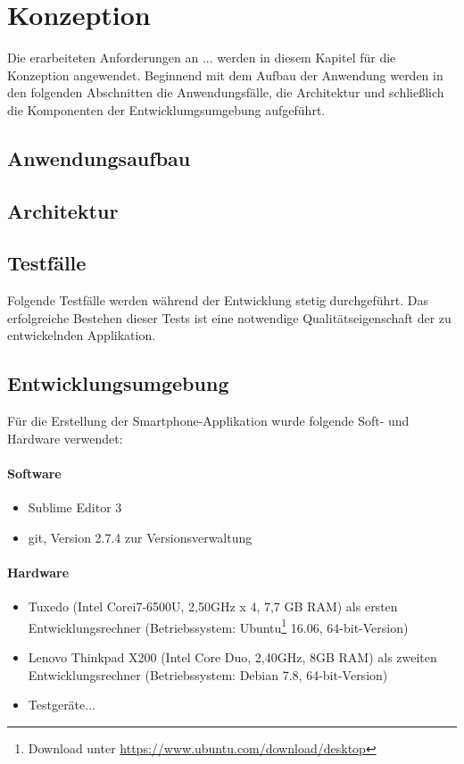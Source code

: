 \chapter{\label{chap:konzeption}Konzeption}
Die erarbeiteten Anforderungen an ... werden in diesem Kapitel für die Konzeption angewendet.
Beginnend mit dem Aufbau der Anwendung werden in den folgenden Abschnitten die Anwendungsfälle,
die Architektur und schließlich die Komponenten der Entwicklumgsumgebung aufgeführt.
%
%
\section{Anwendungsaufbau}
%
%
\section{Architektur}
%
%
\section{Testfälle}
Folgende Testfälle werden während der Entwicklung stetig durchgeführt. Das erfolgreiche Bestehen dieser Tests ist eine notwendige Qualitätseigenschaft der zu entwickelnden Applikation.
%
%
\section{Entwicklungsumgebung}
Für die Erstellung der Smartphone-Applikation wurde folgende Soft- und Hardware verwendet:
\subsubsection{Software}
\begin{itemize}
	\item Sublime Editor 3
	\item git, Version 2.7.4 zur Versionsverwaltung
\end{itemize}
\subsubsection{Hardware}
\begin{itemize}
	\item Tuxedo (Intel\textsuperscript{\textregistered} Core\texttrademark i7-6500U, 2,50GHz x 4, 7,7 GB RAM) als ersten Entwicklungsrechner
	(Betriebssystem: Ubuntu\footnote{ Download unter \url{https://www.ubuntu.com/download/desktop}} 16.06, 64-bit-Version)
	\item Lenovo Thinkpad X200 (Intel\textsuperscript{\textregistered} Core Duo, 2,40GHz, 8GB RAM) als zweiten Entwicklungsrechner (Betriebssystem: Debian 7.8, 64-bit-Version)
	\item Testgeräte...
\end{itemize}
